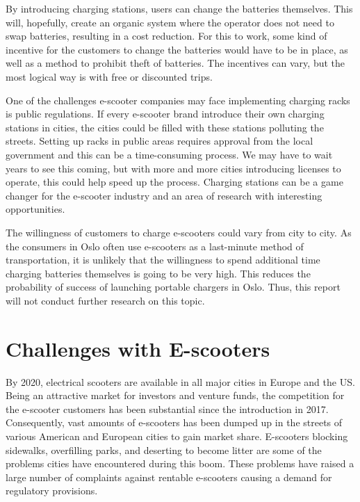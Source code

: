 By introducing charging stations, users can change the batteries themselves. This will, hopefully, create an organic system where the operator does not need to swap batteries, resulting in a cost reduction. For this to work, some kind of incentive for the customers to change the batteries would have to be in place, as well as a method to prohibit theft of batteries. The incentives can vary, but the most logical way is with free or discounted trips. 

One of the challenges e-scooter companies may face implementing charging racks is public regulations. If every e-scooter brand introduce their own charging stations in cities, the cities could be filled with these stations polluting the streets. Setting up racks in public areas requires approval from the local government and this can be a time-consuming process. We may have to wait years to see this coming, but with more and more cities introducing licenses to operate, this could help speed up the process. Charging stations can be a game changer for the e-scooter industry and an area of research with interesting opportunities.  

The willingness of customers to charge e-scooters could vary from city to city. As the consumers in Oslo often use e-scooters as a last-minute method of transportation, it is unlikely that the willingness to spend additional time charging batteries themselves is going to be very high. This reduces the probability of success of launching portable chargers in Oslo. Thus, this report will not conduct further research on this topic.

\section{Challenges with E-scooters}\label{challenges}

By 2020, electrical scooters are available in all major cities in Europe and the US. Being an attractive market for investors and venture funds, the competition for the e-scooter customers has been substantial since the introduction in 2017. Consequently,  vast amounts of e-scooters has been dumped up in the streets of various American and European cities to gain market share. E-scooters blocking sidewalks, overfilling parks, and deserting to become litter are some of the problems cities have encountered during this boom. These problems have raised a large number of complaints against rentable e-scooters causing a demand for regulatory provisions. 

